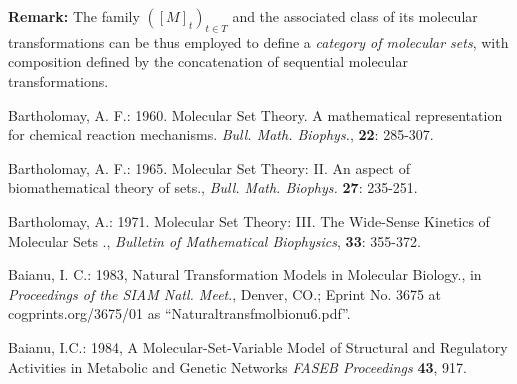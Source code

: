 \documentclass[12pt]{article}
\theoremstyle{plain}
\theoremstyle{definition}
\numberwithin{equation}{section}
\begin{document}
\textbf{Remark:}
The family $([M]_t)_{t \in T}$ and the associated class of its molecular transformations
can be thus employed to define a \emph{category of molecular sets}, with composition defined by the
concatenation of sequential molecular transformations.

\begin{thebibliography}{9}

Bartholomay, A. F.: 1960. Molecular Set Theory. A mathematical representation for chemical reaction mechanisms. \emph{Bull. Math. Biophys.}, \textbf{22}: 285-307.

Bartholomay, A. F.: 1965. Molecular Set Theory: II. An aspect of biomathematical theory of sets., \emph{Bull. Math. Biophys.} \textbf{27}: 235-251.

Bartholomay, A.: 1971. Molecular Set Theory: III. The Wide-Sense Kinetics of Molecular Sets ., \emph{Bulletin of Mathematical Biophysics}, \textbf{33}: 355-372.

Baianu, I. C.: 1983, Natural Transformation Models in Molecular Biology., in \emph{Proceedings of the SIAM Natl. Meet}., Denver, CO.; Eprint No. 3675 at cogprints.org/3675/01 as ``Naturaltransfmolbionu6.pdf''.

Baianu, I.C.: 1984, A Molecular-Set-Variable Model of Structural
and Regulatory Activities in Metabolic and Genetic Networks
\emph{FASEB Proceedings} \textbf{43}, 917.

\end{thebibliography}
\end{document}
